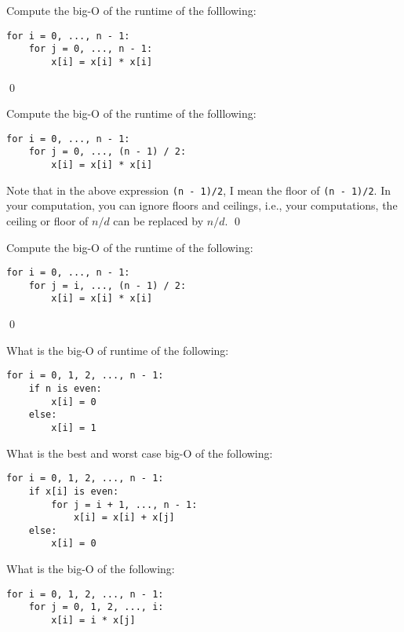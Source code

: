 \begin{ex}
Compute the big-O of the runtime of the folllowing:
\begin{Verbatim}[frame=single, fontsize=\footnotesize]
for i = 0, ..., n - 1:
    for j = 0, ..., n - 1:
        x[i] = x[i] * x[i]
\end{Verbatim}
\qed
\end{ex}


\begin{ex}
Compute the big-O of the runtime of the folllowing:
\begin{Verbatim}[frame=single, fontsize=\footnotesize]
for i = 0, ..., n - 1:
    for j = 0, ..., (n - 1) / 2:
        x[i] = x[i] * x[i]
\end{Verbatim}
Note that in the above expression \verb!(n - 1)/2!, 
I mean the floor of \verb!(n - 1)/2!.
In your computation, you can ignore floors and ceilings, 
i.e., your computations, the ceiling or floor of $n / d$ can be
replaced by $n / d$.
\qed
\end{ex}

\begin{ex}
Compute the big-O of the runtime of the following:
\begin{Verbatim}[frame=single, fontsize=\footnotesize]
for i = 0, ..., n - 1:
    for j = i, ..., (n - 1) / 2:
        x[i] = x[i] * x[i]
\end{Verbatim}
\qed
\end{ex}

\begin{ex}
What is the big-O of runtime of the following:
\begin{Verbatim}[frame=single, fontsize=\footnotesize]
for i = 0, 1, 2, ..., n - 1:
    if n is even:
        x[i] = 0
    else:
        x[i] = 1
\end{Verbatim}
\end{ex}



\begin{ex}
What is the best and worst case big-O of the following:
\begin{Verbatim}[frame=single, fontsize=\footnotesize]
for i = 0, 1, 2, ..., n - 1:
    if x[i] is even:
        for j = i + 1, ..., n - 1:
            x[i] = x[i] + x[j]
    else:
        x[i] = 0
\end{Verbatim}
\end{ex}


\begin{ex}
What is the big-O of the following:
\begin{Verbatim}[frame=single, fontsize=\footnotesize]
for i = 0, 1, 2, ..., n - 1:
    for j = 0, 1, 2, ..., i:
        x[i] = i * x[j] 
\end{Verbatim}
\end{ex}



